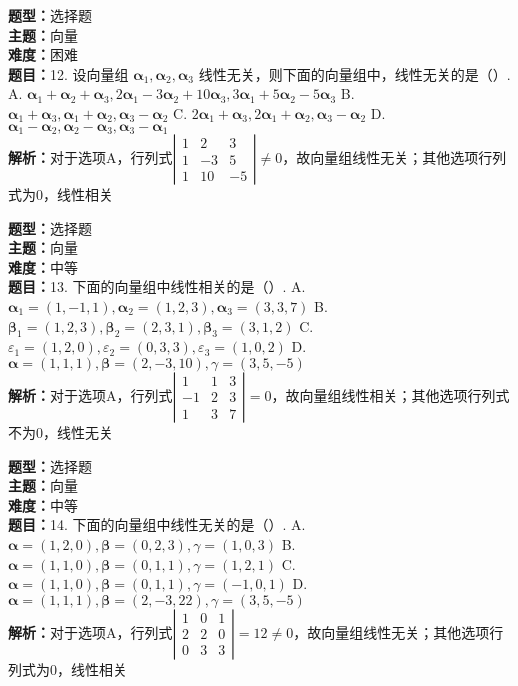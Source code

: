 \documentclass{ctexart}
\newenvironment{question}[5]{%
	\noindent\textbf{题型：}#1\\
	\textbf{主题：}#2\\
	\textbf{难度：}#3\\
	\textbf{题目：}#4\\
	\textbf{解析：}#5\\
	\vspace{1em}
}{}
\begin{document}
	\begin{question}
		{选择题}
		{向量}
		{困难}
		{12. 设向量组 \(\boldsymbol{\alpha}_1, \boldsymbol{\alpha}_2, \boldsymbol{\alpha}_3\) 线性无关，则下面的向量组中，线性无关的是（）. 
			A. \(\boldsymbol{\alpha}_1+\boldsymbol{\alpha}_2+\boldsymbol{\alpha}_3, 2\boldsymbol{\alpha}_1-3\boldsymbol{\alpha}_2+10\boldsymbol{\alpha}_3, 3\boldsymbol{\alpha}_1+5\boldsymbol{\alpha}_2-5\boldsymbol{\alpha}_3\)
			B. \(\boldsymbol{\alpha}_1+\boldsymbol{\alpha}_3, \boldsymbol{\alpha}_1+\boldsymbol{\alpha}_2, \boldsymbol{\alpha}_3-\boldsymbol{\alpha}_2\)
			C. \(2\boldsymbol{\alpha}_1+\boldsymbol{\alpha}_3, 2\boldsymbol{\alpha}_1+\boldsymbol{\alpha}_2, \boldsymbol{\alpha}_3-\boldsymbol{\alpha}_2\)
			D. \(\boldsymbol{\alpha}_1-\boldsymbol{\alpha}_2, \boldsymbol{\alpha}_2-\boldsymbol{\alpha}_3, \boldsymbol{\alpha}_3-\boldsymbol{\alpha}_1\)}
		{对于选项A，行列式\(\left|\begin{array}{ccc}1 & 2 & 3 \\ 1 & -3 & 5 \\ 1 & 10 & -5\end{array}\right| \neq 0\)，故向量组线性无关；其他选项行列式为0，线性相关}
	\end{question}
	
	\begin{question}
		{选择题}
		{向量}
		{中等}
		{13. 下面的向量组中线性相关的是（）. 
			A. \(\boldsymbol{\alpha}_1=(1,-1,1), \boldsymbol{\alpha}_2=(1,2,3), \boldsymbol{\alpha}_3=(3,3,7)\)
			B. \(\boldsymbol{\beta}_1=(1,2,3), \boldsymbol{\beta}_2=(2,3,1), \boldsymbol{\beta}_3=(3,1,2)\)
			C. \(\varepsilon_1=(1,2,0), \varepsilon_2=(0,3,3), \varepsilon_3=(1,0,2)\)
			D. \(\boldsymbol{\alpha}=(1,1,1), \boldsymbol{\beta}=(2,-3,10), \gamma=(3,5,-5)\)}
		{对于选项A，行列式\(\left|\begin{array}{ccc}1 & 1 & 3 \\ -1 & 2 & 3 \\ 1 & 3 & 7\end{array}\right|=0\)，故向量组线性相关；其他选项行列式不为0，线性无关}
	\end{question}
	
	\begin{question}
		{选择题}
		{向量}
		{中等}
		{14. 下面的向量组中线性无关的是（）. 
			A. \(\boldsymbol{\alpha}=(1,2,0), \boldsymbol{\beta}=(0,2,3), \gamma=(1,0,3)\)
			B. \(\boldsymbol{\alpha}=(1,1,0), \boldsymbol{\beta}=(0,1,1), \gamma=(1,2,1)\)
			C. \(\boldsymbol{\alpha}=(1,1,0), \boldsymbol{\beta}=(0,1,1), \gamma=(-1,0,1)\)
			D. \(\boldsymbol{\alpha}=(1,1,1), \boldsymbol{\beta}=(2,-3,22), \gamma=(3,5,-5)\)}
		{对于选项A，行列式\(\left|\begin{array}{lll}1 & 0 & 1 \\ 2 & 2 & 0 \\ 0 & 3 & 3\end{array}\right|=12 \neq 0\)，故向量组线性无关；其他选项行列式为0，线性相关}
	\end{question}
	
\end{document}
